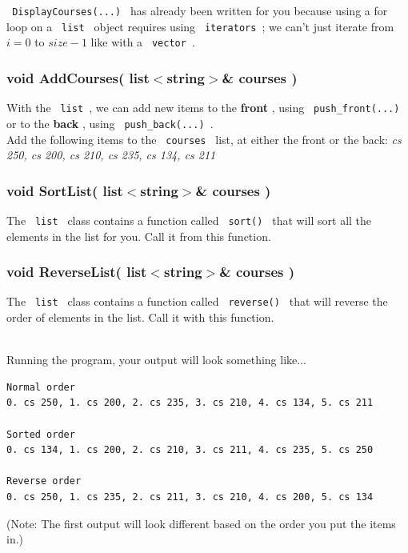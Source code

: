 \documentclass[a4paper,12pt]{book}
\begin{document}
                    \texttt{ DisplayCourses(...) } has already been
                    written for you because using a for loop on a
                    \texttt{ list } object requires using \texttt{ iterators };
                    we can't just iterate from $ i = 0 $ to $ size-1 $
                    like with a \texttt{ vector }.
                    
                \hrulefill{}
                \subsubsection*{ void AddCourses( list$<$string$>$\& courses ) }

                    With the \texttt{ list }, we can add new items to the
                    \textbf{ front }, using \texttt{ push\_front(...) }
                    or to the \textbf{ back }, using \texttt{ push\_back(...) }. \\

                    Add the following items to the \texttt{ courses } list,
                    at either the front or the back:
                    \textit{ cs 250, cs 200, cs 210, cs 235, cs 134, cs 211 }
                
                \hrulefill{}
                \subsubsection*{ void SortList( list$<$string$>$\& courses ) }
                    The \texttt{ list } class contains a function called
                    \texttt{ sort() } that will sort all the elements in
                    the list for you. Call it from this function.

                \hrulefill{}
                \subsubsection*{ void ReverseList( list$<$string$>$\& courses ) }
                    The \texttt{ list } class contains a function called
                    \texttt{ reverse() } that will reverse the order of
                    elements in the list. Call it with this function.


                \hrulefill{}
                
                
                ~\\ Running the program, your output will look something like...
\begin{lstlisting}[style=output]
Normal order
0. cs 250, 1. cs 200, 2. cs 235, 3. cs 210, 4. cs 134, 5. cs 211

Sorted order
0. cs 134, 1. cs 200, 2. cs 210, 3. cs 211, 4. cs 235, 5. cs 250

Reverse order
0. cs 250, 1. cs 235, 2. cs 211, 3. cs 210, 4. cs 200, 5. cs 134
\end{lstlisting}
                    (Note: The first output will look different based on
                    the order you put the items in.)
\end{document}
